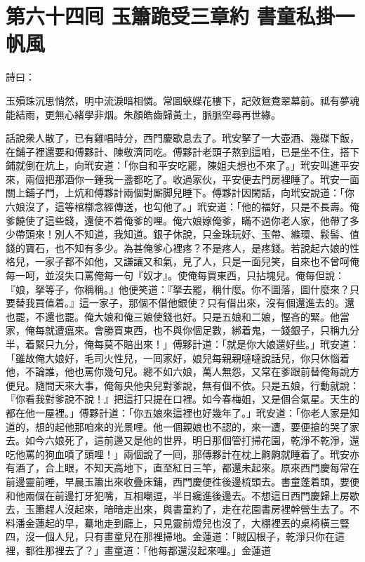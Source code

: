 
\chapter*{第六十四囘 玉簫跪受三章約 書童私掛一帆風}


詩曰：

玉殞珠沉思悄然，明中流淚暗相憐。常圖蛺蝶花樓下，記效鴛鴦翠幕前。祗有夢魂能結雨，更無心緒學非烟。朱顏皓齒歸黃土，脈脈空尋再世緣。

話說衆人散了，已有雞唱時分，西門慶歇息去了。玳安拏了一大壺酒、幾碟下飯，在鋪子裡還要和傅夥計、陳敬濟同吃。傅夥計老頭子熬到這咱，已是坐不住，搭下鋪就倒在炕上，向玳安道：「你自和平安吃罷，陳姐夫想也不來了。」玳安叫進平安來，兩個把那酒你一鍾我一盞都吃了。收過家伙，平安便去門房裡睡了。玳安一面關上鋪子門，上炕和傅夥計兩個對厮脚兒睡下。傅夥計因閑話，向玳安說道：「你六娘沒了，這等棺槨念經傳送，也勾他了。」玳安道：「他的福好，只是不長壽。俺爹饒使了這些錢，還使不着俺爹的哩。俺六娘嫁俺爹，瞞不過你老人家，他帶了多少帶頭來！別人不知道，我知道。銀子休說，只金珠玩好、玉帶、縧環、鬏髻、值錢的寶石，也不知有多少。為甚俺爹心裡疼？不是疼人，是疼錢。{}若說起六娘的性格兒，一家子都不如他，又謙讓又和氣，見了人，只是一面兒笑，自來也不曾呵俺每一呵，並沒失口罵俺每一句『奴才』。使俺每買東西，只拈塊兒。俺每但說：『娘，拏等子，你稱稱。』他便笑道：『拏去罷，稱什麼。你不圖落，圖什麼來？只要替我買值着。』這一家子，那個不借他銀使？只有借出來，沒有個還進去的。還也罷，不還也罷。俺大娘和俺三娘使錢也好。只是五娘和二娘，慳吝的緊。他當家，俺每就遭瘟來。會勝買東西，也不與你個足數，綁着鬼，一錢銀子，只稱九分半，着緊只九分，俺每莫不賠出來！」{}傅夥計道：「就是你大娘還好些。」玳安道：「雖故俺大娘好，毛司火性兒，一囘家好，娘兒每親親噠噠說話兒，你只休惱着他，不論誰，他也罵你幾句兒。{}總不如六娘，萬人無怨，又常在爹跟前替俺每說方便兒。隨問天來大事，俺每央他央兒對爹說，無有個不依。只是五娘，行動就說：『你看我對爹說不說！』把這打只提在口裡。如今春梅姐，又是個合氣星。天生的都在他一屋裡。」{}傅夥計道：「你五娘來這裡也好幾年了。」玳安道：「你老人家是知道的，想的起他那咱來的光景哩。{}他一個親娘也不認的，來一遭，要便搶的哭了家去。{}如今六娘死了，這前邊又是他的世界，明日那個管打掃花園，乾淨不乾淨，還吃他罵的狗血噴了頭哩！」兩個說了一囘，那傅夥計在枕上齁齁就睡着了。{}玳安亦有酒了，合上眼，不知天高地下，直至紅日三竿，都還未起來。原來西門慶每常在前邊靈前睡，早晨玉簫出來收疊床鋪，西門慶便徃後邊梳頭去。書童蓬着頭，要便和他兩個在前邊打牙犯嘴，互相嘲逗，半日纔進後邊去。不想這日西門慶歸上房歇去，玉簫趕人沒起來，暗暗走出來，與書童約了，走在花園書房裡幹營生去了。不料潘金蓮起的早，驀地走到廳上，只見靈前燈兒也沒了，大棚裡丟的桌椅橫三豎四，沒一個人兒，{}只有畫童兒在那裡掃地。金蓮道：「賊囚根子，乾淨只你在這裡，都徃那裡去了？」畫童道：「他每都還沒起來哩。」金蓮道